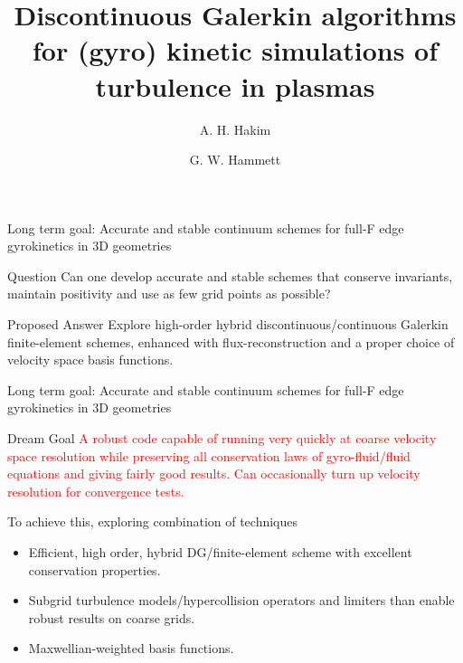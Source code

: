 \documentclass[pdf]{beamer}
\title[Continuum Discontinuous Galerkin Algorithms]{Discontinuous
  Galerkin algorithms for (gyro) kinetic simulations of turbulence in
  plasmas}%
\author{A. H. Hakim \and G. W. Hammett}%
\institute[http://www.ammar-hakim.org/sj] %
{
  Princeton Plasma Physics Laboratory, Princeton, NJ\\
  ammar@princeton.edu\\
  \url{http://www.ammar-hakim.org/sj}
}
\newcommand{\mypause}{}
\theoremstyle{definition}
\begin{document}
\begin{frame}
  \titlepage
\end{frame}

\begin{frame}{Long term goal: Accurate and stable continuum schemes
    for full-F edge gyrokinetics in 3D geometries}

  \begin{block}{Question}
    \small
    Can one develop accurate and stable schemes that conserve
    invariants, maintain positivity and use as few grid points as
    possible?
  \end{block}
  \mypause
  \begin{block}{Proposed Answer}
    \small
    Explore high-order hybrid discontinuous/continuous Galerkin
    finite-element schemes, enhanced with flux-reconstruction and a
    proper choice of velocity space basis functions.
  \end{block}

\end{frame}

\begin{frame}{Long term goal: Accurate and stable continuum schemes
    for full-F edge gyrokinetics in 3D geometries}

  \begin{block}{Dream Goal}
    \textcolor{red}{A robust code capable of running very quickly at
      coarse velocity space resolution while preserving all
      conservation laws of gyro-fluid/fluid equations and giving
      fairly good results. Can occasionally turn up velocity
      resolution for convergence tests.}
  \end{block}
  \mypause
  To achieve this, exploring combination of techniques
  \begin{itemize}
  \item Efficient, high order, hybrid DG/finite-element scheme with
    excellent conservation properties.
  \item Subgrid turbulence models/hypercollision operators and
    limiters than enable robust results on coarse grids.
  \item Maxwellian-weighted basis functions.
  \end{itemize}

\end{frame}
\end{document}

